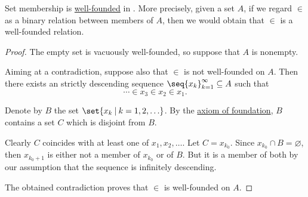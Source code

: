 \begin{proposition}\label{thm:set_membership_is_well_founded}
  Set membership is \hyperref[def:well_founded_relation]{well-founded} in . More precisely, given a set \( A \), if we regard \( \in \) as a binary relation between members of \( A \), then we would obtain that \( \in \) is a well-founded relation.
\end{proposition}
\begin{proof}
  The empty set is vacuously well-founded, so suppose that \( A \) is nonempty.

  Aiming at a contradiction, suppose also that \( \in \) is not well-founded on \( A \). Then there exists an strictly descending sequence \( \seq{ x_k }_{k=1}^\infty \subseteq A \) such that
  \begin{equation*}
    \cdots \in x_3 \in x_2 \in x_1.
  \end{equation*}

  Denote by \( B \) the set \( \set{ x_k \given k = 1, 2, \ldots } \). By the \hyperref[def:zfc/foundation]{axiom of foundation}, \( B \) contains a set \( C \) which is disjoint from \( B \).

  Clearly \( C \) coincides with at least one of \( x_1, x_2, \ldots \). Let \( C = x_{k_0} \). Since \( x_{k_0} \cap B = \varnothing \), then \( x_{k_0 + 1} \) is either not a member of \( x_{k_0} \) or of \( B \). But it is a member of both by our assumption that the sequence is infinitely descending.

  The obtained contradiction proves that \( \in \) is well-founded on \( A \).
\end{proof}

